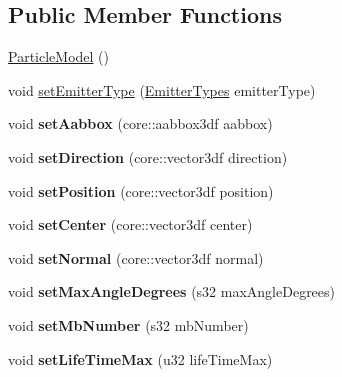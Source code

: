 \subsection*{Public Member Functions}
\begin{DoxyCompactItemize}
\item 
\hyperlink{class_particle_model_a10f4ad88fb013be6f42d86012490d0b6}{Particle\-Model} ()
\item 
void \hyperlink{class_particle_model_a0632fbf8ac2805c1235fa28f7ee42a4b}{set\-Emitter\-Type} (\hyperlink{class_particle_model_a20dbdb2c6762bb19a57cb1553f73051f}{Emitter\-Types} emitter\-Type)
\item 
\hypertarget{class_particle_model_a4c6fe1f0723ff83f087a26b1d0b758a0}{void {\bfseries set\-Aabbox} (core\-::aabbox3df aabbox)}\label{class_particle_model_a4c6fe1f0723ff83f087a26b1d0b758a0}

\item 
\hypertarget{class_particle_model_a2cfd58da58cea46b8ba4e7131a85379f}{void {\bfseries set\-Direction} (core\-::vector3df direction)}\label{class_particle_model_a2cfd58da58cea46b8ba4e7131a85379f}

\item 
\hypertarget{class_particle_model_acea094d5b21057e397b094e44dfa1c37}{void {\bfseries set\-Position} (core\-::vector3df position)}\label{class_particle_model_acea094d5b21057e397b094e44dfa1c37}

\item 
\hypertarget{class_particle_model_ab3420eaf505d35a6f96bb582c981b13f}{void {\bfseries set\-Center} (core\-::vector3df center)}\label{class_particle_model_ab3420eaf505d35a6f96bb582c981b13f}

\item 
\hypertarget{class_particle_model_abd2f6620ef31fc7e63e356830c0d6849}{void {\bfseries set\-Normal} (core\-::vector3df normal)}\label{class_particle_model_abd2f6620ef31fc7e63e356830c0d6849}

\item 
\hypertarget{class_particle_model_a7fb55c77d94011525ee27dfed38b4734}{void {\bfseries set\-Max\-Angle\-Degrees} (s32 max\-Angle\-Degrees)}\label{class_particle_model_a7fb55c77d94011525ee27dfed38b4734}

\item 
\hypertarget{class_particle_model_aaaf9ea758b3ad884d0885cf38265b7bb}{void {\bfseries set\-Mb\-Number} (s32 mb\-Number)}\label{class_particle_model_aaaf9ea758b3ad884d0885cf38265b7bb}

\item 
\hypertarget{class_particle_model_a9dc4570da03895afb9ab8094b8035991}{void {\bfseries set\-Life\-Time\-Max} (u32 life\-Time\-Max)}\label{class_particle_model_a9dc4570da03895afb9ab8094b8035991}


\end{DoxyCompactItemize}
